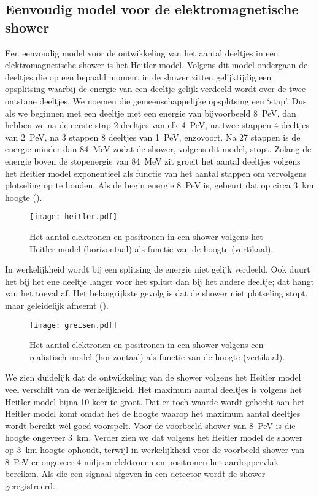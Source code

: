 \subsection{Eenvoudig model voor de elektromagnetische shower}
Een eenvoudig model voor de ontwikkeling van het aantal deeltjes in een elektromagnetische shower is het Heitler model. Volgens dit model ondergaan de deeltjes die op een bepaald moment in de shower zitten gelijktijdig een opsplitsing waarbij de energie van een deeltje gelijk verdeeld wordt over de twee ontstane deeltjes. We noemen die gemeenschappelijke opsplitsing een `stap'. Dus als we beginnen met een deeltje met een energie van bijvoorbeeld \SI{8}{\peta\electronvolt}, dan hebben we na de eerste stap 2 deeltjes van elk \SI{4}{\peta\electronvolt}, na twee stappen 4 deeltjes van \SI{2}{\peta\electronvolt}, na 3 stappen 8 deeltjes van \SI{1}{\peta\electronvolt}, enzovoort. Na 27 stappen is de energie minder dan \SI{84}{\mega\electronvolt} zodat de shower, volgens dit model, stopt. Zolang de energie boven de stopenergie van \SI{84}{\mega\electronvolt} zit groeit het aantal deeltjes volgens het Heitler model exponentieel als functie van het aantal stappen om vervolgens plotseling op te houden. Als de begin energie \SI{8}{\peta\electronvolt} is, gebeurt dat op circa \SI{3}{\km} hoogte (). 
\begin{figure}
\centering
\texttt{[image: heitler.pdf]}
\caption{Het aantal elektronen en positronen in een shower volgens het Heitler model (horizontaal) als functie van de hoogte (vertikaal).}
\label{fig:heitler}
\end{figure}
In werkelijkheid wordt bij een splitsing de energie niet gelijk verdeeld. Ook duurt het bij het ene deeltje langer voor het splitst dan bij het andere deeltje; dat hangt van het toeval af. Het belangrijkste gevolg is dat de shower niet plotseling stopt, maar geleidelijk afneemt ().
\begin{figure}
\centering
\texttt{[image: greisen.pdf]}
\caption{Het aantal elektronen en positronen in een shower volgens een realistisch model (horizontaal) als functie van de hoogte (vertikaal).}
\label{fig:greisen}
\end{figure}
We zien duidelijk dat de ontwikkeling van de shower volgens het Heitler model veel verschilt van de werkelijkheid. Het maximum aantal deeltjes is volgens het Heitler model bijna 10 keer te groot. Dat er toch waarde wordt gehecht aan het Heitler model komt omdat het de hoogte waarop het maximum aantal deeltjes wordt bereikt w\'el goed voorspelt. Voor de voorbeeld shower van \SI{8}{\peta\electronvolt} is die hoogte ongeveer \SI{3}{\km}. Verder zien we dat volgens het Heitler model de shower op \SI{3}{\km} hoogte ophoudt, terwijl in werkelijkheid voor de voorbeeld shower van \SI{8}{\peta\electronvolt} er ongeveer 4 miljoen elektronen en positronen het aardoppervlak bereiken. Als die een signaal afgeven in een \hisparc detector wordt de shower geregistreerd.  


